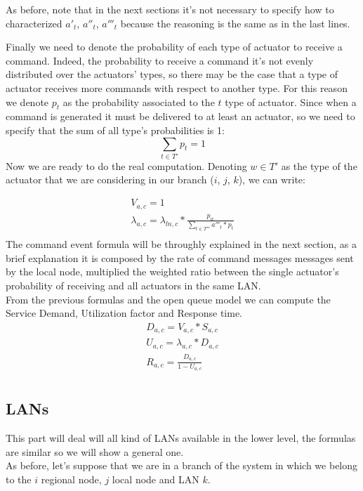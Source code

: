 \documentclass[11pt]{article}
\begin{document}
As before, note that in the next sections it's not necessary to specify how to characterized $a'_{t}$, $a''_{t}$, $a'''_{t}$ because the reasoning is the same as in the last lines.


Finally we need to denote the probability of each type of actuator to receive a command. Indeed, the probability to receive a command it's not evenly distributed over the actuators' types, so there may be the case that a type of actuator receives more commands with respect to another type.
For this reason we denote $p_t$ as the probability associated to the $t$ type of actuator.
Since when a command is generated it must be delivered to at least an actuator, so we need to specify that the sum of all type's probabilities is 1:
\begin{equation}
    \sum_{t \in T'}{p_t} = 1
\end{equation}
Now we are ready to do the real computation. Denoting $w \in T'$ as the type of the actuator that we are considering in our branch ($i$, $j$, $k$), we can write:

\begin{equation}
	\begin{array}{l}
		V_{a,c} = 1 \\

		\lambda_{a, c} = \lambda_{ln, c} * \frac{p_{w}}{\sum\limits_{t \in T'''}{a'''_{t} * p_{t}}}   \\
	\end{array}
\end{equation}
The command event formula will be throughly explained in the next section, as a brief explanation it is composed by the rate of command messages messages sent by the local node, multiplied the weighted ratio between the single actuator's probability of receiving and all actuators in the same LAN.\\
From the previous formulas and the open queue model we can compute the Service Demand, Utilization factor and Response time.
\begin{equation}
	\begin{array}{l}
		D_{a, c} = V_{a, c} * S_{a, c} \\
		U_{a, c} = \lambda_{a, c} * D_{a, c} \\
		R_{a, c} = \frac{D_{a, c}}{1 - U_{a,c}} \\
	\end{array}
\end{equation}



\subsection{LANs}
This part will deal will all kind of LANs available in the lower level, the formulas are similar so we will show a general one.\\
As before, let's suppose that we are in a branch of the system in which we belong to the $i$ regional node, $j$ local node and LAN $k$.
\end{document}
